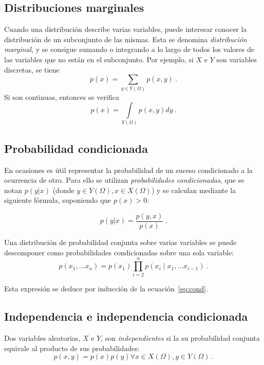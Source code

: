 \subsection{Distribuciones marginales}\label{marginal}

Cuando una distribución describe varias variables, puede interesar
conocer la distribución de un subconjunto de las mismas. Esta se
denomina \emph{distribución marginal}, y se consigue sumando o
integrando a lo largo de todos los valores de las variables que no están
en el subconjunto. Por ejemplo, si \(X\) e \(Y\) son variables
discretas, se tiene \[p(x) = \sum_{y\in Y(\Omega)}p(x, y)~.\] Si son
continuas, entonces se verifica
\[p(x) = \int\limits_{Y(\Omega)}p(x, y)dy~.\]

\subsection{Probabilidad condicionada}\label{probabilidad-condicionada}

En ocasiones es útil representar la probabilidad de un suceso
condicionado a la ocurrencia de otro. Para ello se utilizan
\emph{probabilidades condicionadas}, que se notan \(p(y|x)\) (donde
\(y\in Y(\Omega), x\in X(\Omega)\)) y se calculan mediante la siguiente
fórmula, suponiendo que \(p(x) > 0\):

\begin{equation}p(y|x)=\frac{p(y,x)}{p(x)}~.\label{eq:cond}\end{equation}


Una distribución de probabilidad conjunta sobre varias variables se
puede descomponer como probabilidades condicionadas sobre una sola
variable:
\[p(x_1, \dots x_n) = p(x_1)\prod\limits_{i=2}^n p(x_i\mid x_1, \dots x_{i-1})~.\]

Esta expresión se deduce por inducción de la ecuación~\eqref{eq:cond}.

\subsection{Independencia e independencia
condicionada}\label{independencia-e-independencia-condicionada}

Dos variables aleatorias, \(X\) e \(Y\), son \emph{independientes} si
la su probabilidad conjunta equivale al producto de sus probabilidades:
\[p(x,y)=p(x)p(y)\forall x\in X(\Omega),y\in Y(\Omega)~.\]

